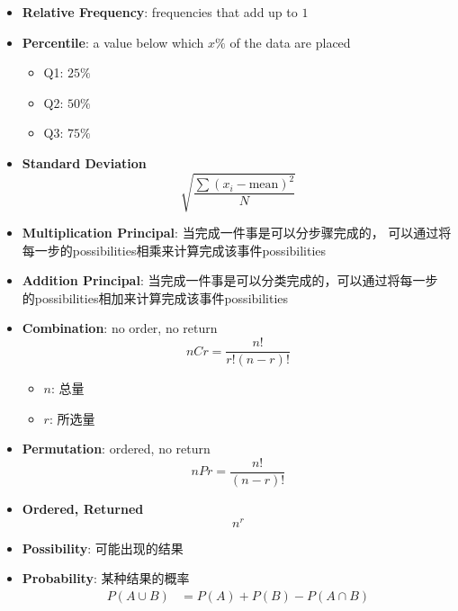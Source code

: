 \begin{multicols}{2}
\begin{itemize}
    \item \textbf{Relative Frequency}: frequencies that add up to $ 1 $
    \item \textbf{Percentile}: a value below which $ x \% $ of the data are
    placed
    \begin{itemize}
      \item Q1: $ 25\% $
      \item Q2: $ 50\% $
      \item Q3: $ 75\% $
    \end{itemize}

    \item \textbf{Standard Deviation}
    \begin{equation}
      \sqrt{\frac{\sum \left( x_{i} - \text{mean} \right)^{2}}{N}}
    \end{equation}

    \item \textbf{Multiplication Principal}: 当完成一件事是可以分步骤完成的，
    可以通过将每一步的possibilities相乘来计算完成该事件possibilities
    \item \textbf{Addition Principal}: 当完成一件事是可以分类完成的，可以通过将每一步
    的possibilities相加来计算完成该事件possibilities

    \item \textbf{Combination}: no order, no return
    \begin{equation}
      n C r = \frac{n!}{r! \left( n - r \right)!}
    \end{equation}
    \begin{itemize}
      \item $ n $: 总量
      \item $ r $: 所选量
    \end{itemize}

    \item \textbf{Permutation}: ordered, no return
    \begin{equation}
      n P r = \frac{n!}{\left( n - r \right)!}
    \end{equation}

    \item \textbf{Ordered, Returned}
    \begin{equation}
      n^{r}
    \end{equation}

    \item \textbf{Possibility}: 可能出现的结果
    \item \textbf{Probability}: 某种结果的概率
    \begin{align}
      P\left( A \cup B \right) &= P\left( A \right) + P\left( B \right) - P\left( A \cap B \right)
    \end{align}


\end{itemize}
\end{multicols}
